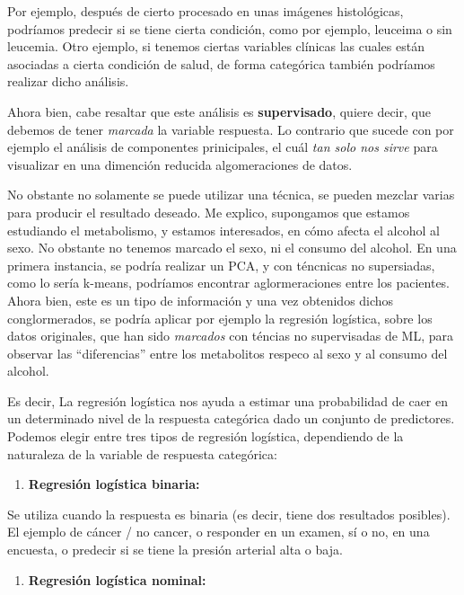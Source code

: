 \documentclass[
  letterpaper,
  DIV=11,
  numbers=noendperiod]{scrartcl}
\providecommand{\tightlist}{%
  \setlength{\itemsep}{0pt}\setlength{\parskip}{0pt}}\usepackage{longtable,booktabs,array}
\begin{document}
Por ejemplo, después de cierto procesado en unas imágenes histológicas,
podríamos predecir si se tiene cierta condición, como por ejemplo,
leuceima o sin leucemia. Otro ejemplo, si tenemos ciertas variables
clínicas las cuales están asociadas a cierta condición de salud, de
forma categórica también podríamos realizar dicho análisis.

Ahora bien, cabe resaltar que este análisis es \textbf{supervisado},
quiere decir, que debemos de tener \emph{marcada} la variable respuesta.
Lo contrario que sucede con por ejemplo el análisis de componentes
prinicipales, el cuál \emph{tan solo nos sirve} para visualizar en una
dimención reducida algomeraciones de datos.

No obstante no solamente se puede utilizar una técnica, se pueden
mezclar varias para producir el resultado deseado. Me explico,
supongamos que estamos estudiando el metabolismo, y estamos interesados,
en cómo afecta el alcohol al sexo. No obstante no tenemos marcado el
sexo, ni el consumo del alcohol. En una primera instancia, se podría
realizar un PCA, y con téncnicas no supersiadas, como lo sería k-means,
podríamos encontrar aglormeraciones entre los pacientes. Ahora bien,
este es un tipo de información y una vez obtenidos dichos
conglormerados, se podría aplicar por ejemplo la regresión logística,
sobre los datos originales, que han sido \emph{marcados} con téncias no
supervisadas de ML, para observar las ``diferencias'' entre los
metabolitos respeco al sexo y al consumo del alcohol.

Es decir, La regresión logística nos ayuda a estimar una probabilidad de
caer en un determinado nivel de la respuesta categórica dado un conjunto
de predictores. Podemos elegir entre tres tipos de regresión logística,
dependiendo de la naturaleza de la variable de respuesta categórica:

\begin{enumerate}
\def\labelenumi{\arabic{enumi}.}
\tightlist
\item
  \textbf{Regresión logística binaria:}
\end{enumerate}

Se utiliza cuando la respuesta es binaria (es decir, tiene dos
resultados posibles). El ejemplo de cáncer / no cancer, o responder en
un examen, sí o no, en una encuesta, o predecir si se tiene la presión
arterial alta o baja.

\begin{enumerate}
\def\labelenumi{\arabic{enumi}.}
\setcounter{enumi}{1}
\tightlist
\item
  \textbf{Regresión logística nominal:}
\end{enumerate}
\end{document}
